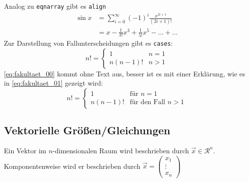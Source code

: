 Analog zu \texttt{eqnarray} gibt es  \texttt{align}
\begin{align}
  \label{eq:ams_sin}%
  \sin x &=  \sum_{i=0}^{\infty}(-1)^{i}\frac{x^{2i+1}}{(2i+1)!}
  \\
  \label{eq:ams_sin_expl}        &=  x - \frac{1}{3!}x^{3} + \frac{1}{5!}x^{5} - \ldots + \ldots
\end{align}
Zur Darstellung von Fallunterscheidungen gibt es \texttt{cases}:
\begin{equation}
    \label{eq:fakultaet_00}
    n! =
    \begin{cases}
      1 & n=1\\
      n(n-1)! & n > 1
    \end{cases}
\end{equation}
\cref{eq:fakultaet_00} kommt ohne Text aus, besser ist es mit einer Erklärung,
wie es in \cref{eq:fakultaet_01} gezeigt wird:
\begin{equation}
    \label{eq:fakultaet_01}
    n! =
    \begin{cases}
      1 & \text{für } n=1\\          %
      n(n-1)! & \text{für den Fall } n > 1    %
    \end{cases}
\end{equation}


\subsection{Vektorielle Größen/Gleichungen}

Ein Vektor im \(n\)-dimensionalen Raum wird beschrieben durch
\(\vec{x} \in \mathcal{R}^{n}\). Komponentenweise wird er beschrieben durch
\(\vec{x} = \left(              %
    \begin{array}{c}
      x_{1} \\ \vdots \\ x_{n}  %
    \end{array}
\right)                   %
\)

